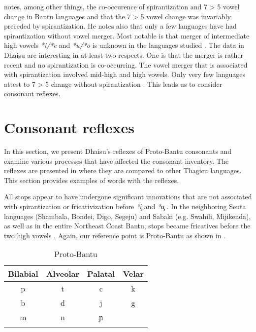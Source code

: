 \documentclass[output=paper,colorlinks,citecolor=brown]{langscibook}
\begin{document}
\citet{Schadeberg1995} notes, among other things, the co-occurence of spirantization and 7 > 5 vowel change in Bantu languages and that the 7 > 5 vowel change was invariably preceded by spirantization. He notes also that only a few languages have had spirantization without vowel merger. Most notable is that merger of intermediate high vowels \textit{*i/*e} and \textit{*u/*o} is unknown in the languages studied \citep{Schadeberg1995}. The data in Dhaisu are interesting in at least two respects. One is that the merger is rather recent and no spirantization is co-occurring. The vowel merger that is associated with spirantization involved mid-high and high vowels. Only very few languages attest to 7 > 5 change without spirantization \citep{Bostoen2008}. This leads us to consider consonant reflexes.

\section{Consonant reflexes}\label{sec:ngonyani:5}

In this section, we present Dhaisu's reflexes of Proto-Bantu consonants and examine various processes that have affected the consonant inventory. The reflexes are presented in \citet[204]{Nurse1982} where they are compared to other Thagicu languages. This section provides examples of words with the reflexes. 

All stops  appear to have undergone significant innovations that are not associated with spirantization or fricativization before \textit{*i̧ }and \textit{*u̧} \citep{Nurse1982,Nurse2000}. In the neighboring Seuta languages (Shambala, Bondei, Digo, Segeju) and Sabaki (e.g. Swahili, Mijikenda), as well as in the entire Northeast Coast Bantu, stops became fricatives before the two high vowels \citep{NurseHinnebusch1993}. Again, our reference point is Proto-Bantu as shown in . 

\begin{table}
	\caption{Proto-Bantu \citep[83]{Meeussen1967}}
	\label{tab:ngonyani:17}
    \begin{tabular}{c c c c}
        \lsptoprule
    	Bilabial & Alveolar & Palatal & Velar\\\midrule
    	p & t & c & k\\
    	b & d & j & g\\
    	m & n & ɲ &  \\
    	\lspbottomrule
    \end{tabular}
\end{table}
\end{document}
